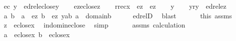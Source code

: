 \begin{isabellebody}
\ {\isacharquery}{\kern0pt}ec{\isacharequal}{\kern0pt}{\isachardoublequoteopen}{\isasymlambda}\ y\ {\isachardot}{\kern0pt}\ edrel{\isacharparenleft}{\kern0pt}eclose{\isacharparenleft}{\kern0pt}{\isacharbraceleft}{\kern0pt}y{\isacharbraceright}{\kern0pt}{\isacharparenright}{\kern0pt}{\isacharparenright}{\kern0pt}{\isachardoublequoteclose}\isanewline
\ \ \isamarkupfalse%
\ {\isacharquery}{\kern0pt}ez{\isacharequal}{\kern0pt}{\isachardoublequoteopen}eclose{\isacharparenleft}{\kern0pt}{\isacharbraceleft}{\kern0pt}z{\isacharbraceright}{\kern0pt}{\isacharparenright}{\kern0pt}{\isachardoublequoteclose}\isanewline
\ \ \isamarkupfalse%
\ {\isacharquery}{\kern0pt}rr{\isacharequal}{\kern0pt}{\isachardoublequoteopen}{\isacharquery}{\kern0pt}ec{\isacharparenleft}{\kern0pt}x{\isacharparenright}{\kern0pt}\ {\isasyminter}\ {\isacharquery}{\kern0pt}ez\ {\isasymtimes}\ {\isacharquery}{\kern0pt}ez{\isachardoublequoteclose}\isanewline
\ \ \isamarkupfalse%
\ y\isanewline
\ \ \isamarkupfalse%
\ yr{\isacharcolon}{\kern0pt}{\isachardoublequoteopen}y\ {\isasymin}\ edrel{\isacharparenleft}{\kern0pt}{\isacharquery}{\kern0pt}ez{\isacharparenright}{\kern0pt}{\isachardoublequoteclose}\isanewline
\ \ \isamarkupfalse%
\ \isamarkupfalse%
\ a\ b\ \ {\isachardoublequoteopen}a\ {\isasymin}\ {\isacharquery}{\kern0pt}ez{\isachardoublequoteclose}\ {\isachardoublequoteopen}b\ {\isasymin}\ {\isacharquery}{\kern0pt}ez{\isachardoublequoteclose}\ {\isachardoublequoteopen}y{\isacharequal}{\kern0pt}{\isasymlangle}a{\isacharcomma}{\kern0pt}b{\isasymrangle}{\isachardoublequoteclose}\ {\isachardoublequoteopen}a\ {\isasymin}\ domain{\isacharparenleft}{\kern0pt}b{\isacharparenright}{\kern0pt}{\isachardoublequoteclose}\isanewline
\ \ \ \ \isamarkupfalse%
\ edrelD\ \isamarkupfalse%
\ blast\isanewline
\ \ \isamarkupfalse%
\isanewline
\ \ \isamarkupfalse%
\ this\ assms\isanewline
\ \ \isamarkupfalse%
\ {\isachardoublequoteopen}z\ {\isasymin}\ eclose{\isacharparenleft}{\kern0pt}x{\isacharparenright}{\kern0pt}{\isachardoublequoteclose}\ \isamarkupfalse%
\ in{\isacharunderscore}{\kern0pt}dom{\isacharunderscore}{\kern0pt}in{\isacharunderscore}{\kern0pt}eclose\ \isamarkupfalse%
\ simp\isanewline
\ \ \isamarkupfalse%
\isanewline
\ \ \isamarkupfalse%
\ assms\ calculation\isanewline
\ \ \isamarkupfalse%
\ {\isachardoublequoteopen}a\ {\isasymin}\ eclose{\isacharparenleft}{\kern0pt}{\isacharbraceleft}{\kern0pt}x{\isacharbraceright}{\kern0pt}{\isacharparenright}{\kern0pt}{\isachardoublequoteclose}\ {\isachardoublequoteopen}b\ {\isasymin}\ eclose{\isacharparenleft}{\kern0pt}{\isacharbraceleft}{\kern0pt}x{\isacharbraceright}{\kern0pt}{\isacharparenright}{\kern0pt}{\isachardoublequoteclose}\ \isamarkupfalse%

\end{isabellebody}
